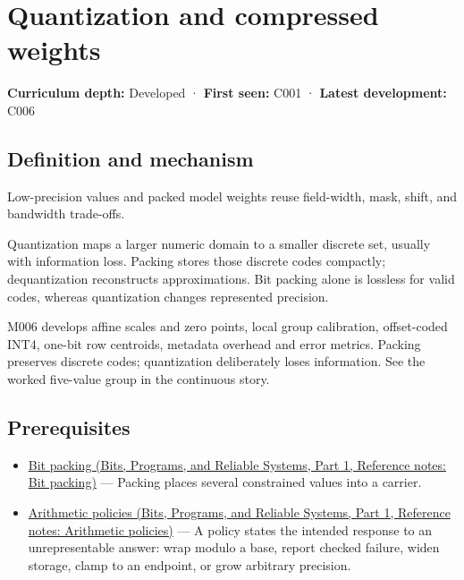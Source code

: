 \hypertarget{appendix-fdc7879e8bf2}{}\label{referencestart:appendix-fdc7879e8bf2}
\section{Quantization and compressed weights}\label{appendix-fdc7879e8bf2-quantization-and-compressed-weights}

\hypertarget{appendix-fdc7879e8bf2-quantization-and-compressed-weights}{}

\textbf{Curriculum depth:} Developed · \textbf{First seen:} C001 · \textbf{Latest development:} C006

\begin{allmightroledefinition}

\subsection{Definition and mechanism}\label{appendix-fdc7879e8bf2-definition-and-mechanism}

\hypertarget{appendix-fdc7879e8bf2-definition-and-mechanism}{}

Low-precision values and packed model weights reuse field-width, mask, shift, and bandwidth trade-offs.

\end{allmightroledefinition}

Quantization maps a larger numeric domain to a smaller discrete set, usually with information loss. Packing stores those discrete codes compactly; dequantization reconstructs approximations. Bit packing alone is lossless for valid codes, whereas quantization changes represented precision.

M006 develops affine scales and zero points, local group calibration, offset-coded INT4, one-bit row centroids, metadata overhead and error metrics. Packing preserves discrete codes; quantization deliberately loses information. See the worked five-value group in the continuous story.

\subsection{Prerequisites}\label{appendix-fdc7879e8bf2-prerequisites}

\hypertarget{appendix-fdc7879e8bf2-prerequisites}{}

\begin{itemize}
\tightlist
\item
  \href{../01-Bits-Programs-and-Reliable-Systems-P01/main.pdf\#appendix-1f9963e1a5d1}{Bit packing (Bits, Programs, and Reliable Systems, Part 1, Reference notes: Bit packing)} --- Packing places several constrained values into a carrier.
\item
  \href{../01-Bits-Programs-and-Reliable-Systems-P01/main.pdf\#appendix-2ed044358b82}{Arithmetic policies (Bits, Programs, and Reliable Systems, Part 1, Reference notes: Arithmetic policies)} --- A policy states the intended response to an unrepresentable answer: wrap modulo a base, report checked failure, widen storage, clamp to an endpoint, or grow arbitrary precision.
\end{itemize}

